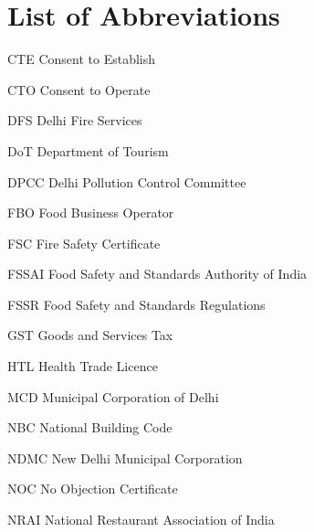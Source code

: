 \documentclass[a4paper, 12pt]{article}
\begin{document}
                   \section*{List of Abbreviations}
                  
        
        \begin{abbrv}        
        
 		\item[CTE]		Consent to Establish
 		\item[CTO]		Consent to Operate
 		\item[DFS]		Delhi Fire Services
 		\item[DoT]			Department of Tourism
 		\item[DPCC]		Delhi Pollution Control Committee
 		\item[FBO]		Food Business Operator
 		\item[FSC]		Fire Safety Certificate
		\item[FSSAI]		Food Safety and Standards Authority of India 
 		\item[FSSR]		Food Safety and Standards Regulations
 		\item[GST]		Goods and Services Tax
 		\item[HTL]			Health Trade Licence
 		\item[MCD]		Municipal Corporation of Delhi
 		\item[NBC]		National Building Code
 		\item[NDMC]		New Delhi Municipal Corporation
 		\item[NOC	]		No Objection Certificate
 		\item[NRAI]		National Restaurant Association of India  
             
               \end{abbrv}


        
		
\end{document}
